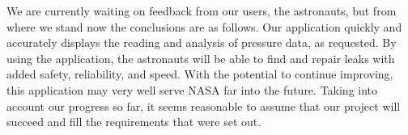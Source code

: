 \documentclass[onecolumn, draftclsnofoot,10pt, compsoc]{IEEEtran}
\begin{document}
We are currently waiting on feedback from our users, the astronauts, but from where we stand now the conclusions are as follows.
Our application quickly and accurately displays the reading and analysis of pressure data, as requested.
By using the application, the astronauts will be able to find and repair leaks with added safety, reliability, and speed.
With the potential to continue improving, this application may very well serve NASA far into the future.
Taking into account our progress so far, it seems reasonable to assume that our project will succeed and fill the requirements that were set out.
​
%
%
%

\newpage


\end{document}
